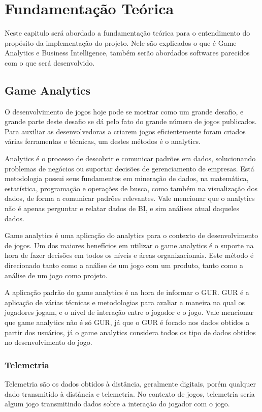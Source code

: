 \chapter[Fundamentação Teórica]{Fundamentação Teórica}
Neste capitulo será abordado a fundamentação teórica para o entendimento do propósito da implementação do projeto. Nele são explicados o que é Game Analytics e Business Intelligence, também serão abordados softwares parecidos com o que será desenvolvido.
\section{Game Analytics}
O desenvolvimento de jogos hoje pode se mostrar como um grande desafio, e grande parte deste desafio se dá pelo fato do grande número de jogos publicados. Para auxiliar as desenvolvedoras a criarem jogos eficientemente foram criados várias ferramentas e técnicas, um destes métodos é o analytics.

Analytics é o processo de descobrir e comunicar padrões em dados, solucionando problemas de negócios ou suportar decisões de gerenciamento de empresas. Está metodologia possui seus fundamentos em mineração de dados, na matemática, estatística, programação e operações de busca, como também na visualização dos dados, de forma a comunicar padrões relevantes. Vale mencionar que o analytics não é apenas perguntar e relatar dados de BI, e sim análises atual daqueles dados\cite{analytics}. 

Game analytics é uma aplicação do analytics para o contexto de desenvolvimento de jogos\cite{game_analytics}. Um dos maiores benefícios em utilizar o game analytics é o suporte na hora de fazer decisões em todos os níveis e áreas organizacionais. Este método é direcionado tanto como a análise de um jogo com um produto, tanto como a análise de um jogo como projeto.

A aplicação padrão do game analytics é na hora de informar o GUR. GUR é a aplicação de várias técnicas e metodologias para avaliar a maneira na qual os jogadores jogam, e o nível de interação entre o jogador e o jogo. Vale mencionar que game analytics não é só GUR, já que o GUR é focado nos dados obtidos a partir dos usuários, já o game analytics considera todos os tipo de dados obtidos no desenvolvimento do jogo.
\subsection{Telemetria}
Telemetria são os dados obtidos à distância, geralmente digitais, porém qualquer dado transmitido à distância e telemetria. No contexto de jogos, telemetria seria algum jogo transmitindo dados sobre a interação do jogador com o jogo.

